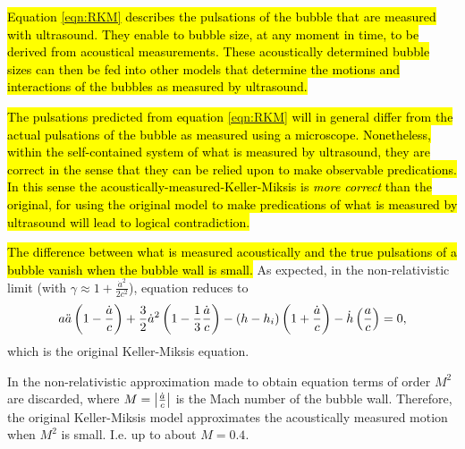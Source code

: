 \hl{
Equation {\ref{eqn:RKM}} describes the pulsations of the bubble that are measured with ultrasound.
They enable to bubble size, at any moment in time, to be derived from acoustical measurements.
These acoustically determined bubble sizes can then be fed into other models that determine the motions and interactions of the 
bubbles as measured by ultrasound.
}


\hl{
  The pulsations predicted from equation {\ref{eqn:RKM}} will in general differ from the actual pulsations of the bubble as measured using a microscope.
  Nonetheless, within the self-contained system of what is measured by ultrasound, they are correct in the sense that they can be relied upon to make observable predications.
  In this sense the  acoustically-measured-Keller-Miksis is \emph{more correct} than the original, 
  for using the original model to make predications of what is measured by ultrasound will lead to logical contradiction. 
}


\hl{
The difference between what is measured acoustically and the true pulsations of a bubble vanish when the bubble wall is small.
}
As expected, in the  non-relativistic limit (with $\gamma \approx 1 + \frac{{\dot a}^2}{2c^2}$), equation  reduces to
\begin{align}
  a \ddot a\left( 1 - \frac{\dot a}{c} \right)+ \frac{3}{2} {\dot a}^2\left( 1- \frac{1}{3}\frac{\dot a }{c} \right)
    - \left( h - h_i \right)\left( 1 + \frac{\dot a}{c} \right)
  -  \dot h \left( \frac{a}{c} \right)
= 0, \label{eqn:KM}
\end{align}
which is the original Keller-Miksis equation\cite{Hoff2001}.

In the non-relativistic approximation made to obtain equation  terms of order $M^2$ are discarded, 
where  $M = \left| \frac{\dot a}{c} \right|$ is the Mach number of the bubble wall.
Therefore, the original Keller-Miksis model approximates the acoustically measured motion when $M^2$ is small.
I.e. %
up to about $M=0.4$.



